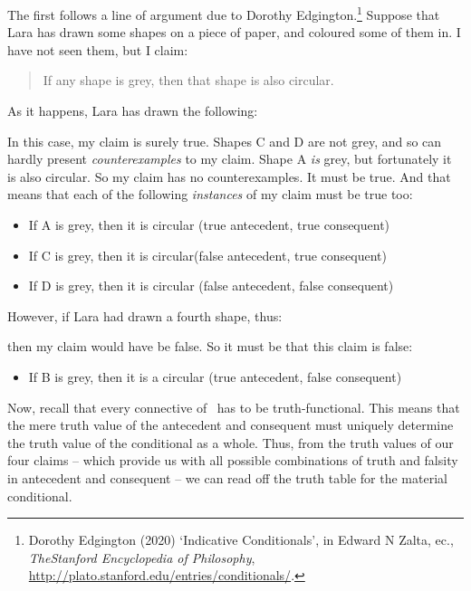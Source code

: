 The first follows a line of argument due to Dorothy Edgington.\footnote{Dorothy Edgington (2020) `Indicative Conditionals', in Edward N Zalta, ec., \emph{TheStanford Encyclopedia of Philosophy}, \url{http://plato.stanford.edu/entries/conditionals/}.}  Suppose that Lara has drawn some shapes on a piece of paper, and coloured some of them in. I have not seen them, but I claim:
	\begin{quote}
		If any shape is grey, then that shape is also circular.
	\end{quote}
As it happens, Lara has drawn the following:
\begin{center}
\end{center}
In this case, my claim is surely true.  Shapes C and D are not grey, and so can hardly present \emph{counterexamples} to my claim. Shape A \emph{is} grey, but fortunately it is also circular. So my claim has no counterexamples. It must be true. And that means that each of the following \emph{instances} of my claim must be true too:
	\begin{itemize}
		\item If A is grey, then it is circular \hfill (true antecedent, true consequent)
		\item If C is grey, then it is circular\hfill (false antecedent, true consequent)
		\item If D is grey, then it is circular \hfill (false antecedent, false consequent)
	\end{itemize}
However, if Lara had drawn a fourth shape, thus:
\begin{center}
\end{center}
then my claim would have be false. So it must be that this claim is false:
	\begin{itemize}
		\item If B is grey, then it is a circular \hfill (true antecedent, false consequent)
	\end{itemize}
Now, recall that every connective of \TFL\ has to be truth-functional. This means that the mere truth value of the antecedent and consequent must uniquely determine the truth value of the conditional as a whole. Thus, from the truth values of our four claims – which provide us with all possible combinations of truth and falsity in antecedent and consequent – we can read off the truth table for the material conditional.

